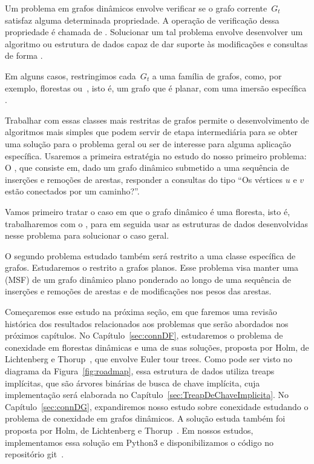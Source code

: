 Um problema em grafos dinâmicos envolve verificar se o grafo corrente~$G_t$ satisfaz alguma determinada propriedade.
A operação de verificação dessa propriedade é chamada de .
Solucionar um tal problema envolve desenvolver um algoritmo ou estrutura de dados capaz de dar suporte às modificações e consultas de forma .

Em alguns casos, restringimos cada~$G_t$ a uma família de grafos, como, por exemplo, florestas ou~, isto é, um grafo que é planar, com uma imersão específica .

Trabalhar com essas classes mais restritas de grafos permite o desenvolvimento de algoritmos mais simples que podem servir de etapa intermediária para se obter uma solução para o problema geral ou ser de interesse para alguma aplicação específica.
Usaremos a primeira estratégia no estudo do nosso primeiro problema:
O , que consiste em, dado um grafo dinâmico submetido a uma sequência de inserções e remoções de arestas, responder a consultas do tipo “Os vértices $u$ e $v$ estão conectados por um caminho?”.

Vamos primeiro tratar o caso em que o grafo dinâmico é uma floresta, isto é, trabalharemos com o ,
para em seguida usar as estruturas de dados desenvolvidas nesse problema para solucionar o caso geral.

O segundo problema estudado também será restrito a uma classe específica de grafos.
Estudaremos o  restrito a grafos planos.
Esse problema visa manter uma  (MSF) de um grafo dinâmico plano ponderado ao longo de uma sequência de inserções e remoções de arestas e de modificações nos pesos das arestas.

Começaremos esse estudo na próxima seção, em que faremos uma revisão histórica dos resultados relacionados aos problemas que serão abordados nos próximos capítulos.
No Capítulo~\ref{sec:connDF}, estudaremos o problema de conexidade em florestas dinâmicas e uma de suas soluções, proposta por Holm, de Lichtenberg e Thorup~\cite{poly_log}, que envolve Euler tour trees.
Como pode ser visto no diagrama da Figura~\ref{fig:roadmap}, essa estrutura de dados utiliza treaps implícitas, que são árvores binárias de busca de chave implícita, cuja implementação será elaborada no Capítulo~\ref{sec:TreapDeChaveImplicita}.
No Capítulo~\ref{sec:connDG}, expandiremos nosso estudo sobre conexidade estudando o problema de conexidade em grafos dinâmicos.
A solução estuda também foi proposta por Holm, de Lichtenberg e Thorup~\cite{poly_log}.
Em nossos estudos, implementamos essa solução em Python3 e disponibilizamos o código no repositório git~\cite{github}.

